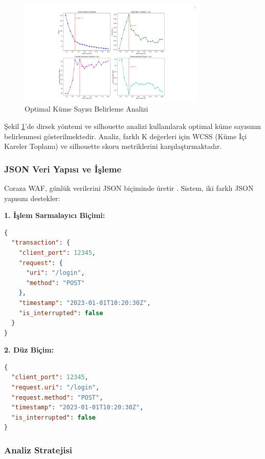 \begin{figure}[!ht]
    \centering
    \includegraphics[width=0.8\textwidth]{images/optimal-kume-sayisi-analizi.png}
    \caption{Optimal Küme Sayısı Belirleme Analizi}
    \label{fig:optimal_clusters}
\end{figure}

Şekil \ref{fig:optimal_clusters}'de dirsek yöntemi ve silhouette analizi kullanılarak optimal küme sayısının belirlenmesi gösterilmektedir. Analiz, farklı K değerleri için WCSS (Küme İçi Kareler Toplamı) ve silhouette skoru metriklerini karşılaştırmaktadır.

\subsubsection{JSON Veri Yapısı ve İşleme}

Coraza WAF, günlük verilerini JSON biçiminde üretir \cite{coraza2023}. Sistem, iki farklı JSON yapısını destekler:

\textbf{1. İşlem Sarmalayıcı Biçimi:}
\begin{lstlisting}[language=json]
{
  "transaction": {
    "client_port": 12345,
    "request": {
      "uri": "/login",
      "method": "POST"
    },
    "timestamp": "2023-01-01T10:20:30Z",
    "is_interrupted": false
  }
}
\end{lstlisting}

\textbf{2. Düz Biçim:}
\begin{lstlisting}[language=json]
{
  "client_port": 12345,
  "request.uri": "/login", 
  "request.method": "POST",
  "timestamp": "2023-01-01T10:20:30Z",
  "is_interrupted": false
}
\end{lstlisting}

\newpage

\subsubsection{Analiz Stratejisi}

